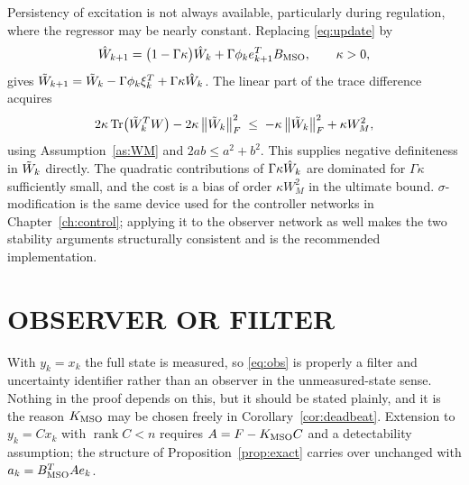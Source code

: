 Persistency of excitation is not always available, particularly during
regulation, where the regressor may be nearly constant. Replacing
\eqref{eq:update} by
\begin{equation}\label{eq:sigmod}
\hat{W}_{k+1}=\bigl(1-\Gamma\kappa\bigr)\hat{W}_k+\Gamma\phi_ke_{k+1}^TB_{\mathrm{MSO}},
\qquad\kappa>0,
\end{equation}
gives $\tilde{W}_{k+1}=\tilde{W}_k-\Gamma\phi_k\xi_k^T+\Gamma\kappa\hat{W}_k$. The linear part
of the trace difference acquires
\begin{equation}\label{eq:sigmodterm}
2\kappa\operatorname{Tr}\bigl(\tilde{W}_k^TW\bigr)-2\kappa\left\lVert \tilde{W}_k \right\rVert_F^2
\;\le\;-\kappa\left\lVert \tilde{W}_k \right\rVert_F^2+\kappa W_M^2 ,
\end{equation}
using Assumption~\ref{as:WM} and $2ab\le a^2+b^2$. This supplies negative
definiteness in $\tilde{W}_k$ directly. The quadratic contributions of
$\Gamma\kappa\hat{W}_k$ are dominated for $\Gamma\kappa$ sufficiently small, and
the cost is a bias of order $\kappa W_M^2$ in the ultimate bound.
$\sigma$-modification \cite{ioannou1983adaptive,ioannou1984sigma} is the same
device used for the controller networks in Chapter~\ref{ch:control}; applying it to the observer network as well makes the
two stability arguments structurally consistent and is the recommended
implementation.

\section{OBSERVER OR FILTER}

With $y_k=x_k$ the full state is measured, so \eqref{eq:obs} is properly a
filter and uncertainty identifier rather than an observer in the
unmeasured-state sense. Nothing in the proof depends on this, but it should be
stated plainly, and it is the reason $K_{\mathrm{MSO}}$ may be chosen freely in
Corollary~\ref{cor:deadbeat}. Extension to $y_k=Cx_k$ with $\operatorname{rank}
C<n$ requires $A=F-K_{\mathrm{MSO}} C$ and a detectability assumption; the structure of
Proposition~\ref{prop:exact} carries over unchanged with
$a_k=B_{\mathrm{MSO}}^TAe_k$.
